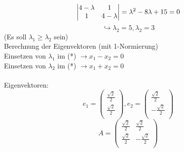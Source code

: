 \documentclass[a4paper,12pt]{scrreprt}
\begin{document}
$$ \begin{vmatrix}
    4 - \lambda & 1\\
    1 & 4 - \lambda \\
   \end{vmatrix} = \lambda^2 - 8\lambda + 15 = 0\\$$
$$ \hookrightarrow \lambda_2 = 5, \lambda_2 = 3$$
(Es soll $\lambda_1 \geq \lambda_2$ sein)\\
Berechnung der Eigenvektoren (mit 1-Normierung)\\
Einsetzen von $\lambda_1$ im (*) $\rightarrow x_1 - x_2 = 0$\\
Einsetzen von $\lambda_2$ im (*) $\rightarrow x_1 + x_2 = 0$\\
\\
Eigenvektoren:\\
$$ e_1 = \begin{pmatrix}
          \frac{\sqrt{2}}{2}\\
          \frac{\sqrt{2}}{2}\\
         \end{pmatrix}, e_2 =
         \begin{pmatrix}
          \frac{\sqrt{2}}{2}\\
          -\frac{\sqrt{2}}{2}\\
         \end{pmatrix} $$
$$ A = \begin{pmatrix}
          \frac{\sqrt{2}}{2} &  \frac{\sqrt{2}}{2}\\
           \frac{\sqrt{2}}{2} &  -\frac{\sqrt{2}}{2}\\
       \end{pmatrix}
 $$
\end{document}
